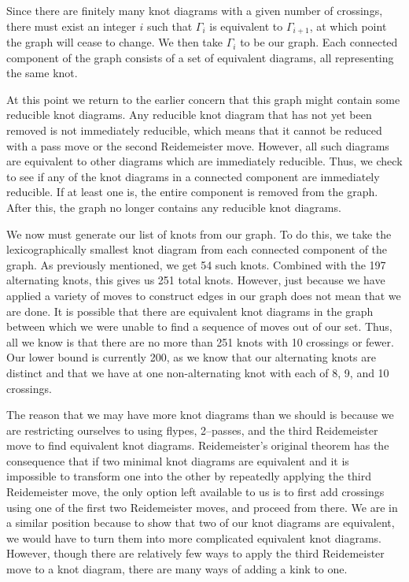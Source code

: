 \begin{paper}
Since there are finitely many knot diagrams with a given number of crossings,
there must exist an integer $i$ such that $\Gamma_i$ is equivalent to
$\Gamma_{i+1}$, at which point the graph will cease to change.
We then take $\Gamma_i$ to be our graph.
Each connected component of the graph consists of a set of equivalent diagrams,
all representing the same knot.

At this point we return to the earlier concern that this graph might contain
some reducible knot diagrams.
Any reducible knot diagram that has not yet been removed is not immediately
reducible, which means that it cannot be reduced with a pass move or the second
Reidemeister move.
However, all such diagrams are equivalent to other diagrams which are
immediately reducible.
Thus, we check to see if any of the knot diagrams in a connected component are
immediately reducible.
If at least one is, the entire component is removed from the graph.
After this, the graph no longer contains any reducible knot diagrams.

We now must generate our list of knots from our graph.
To do this, we take the lexicographically smallest knot diagram from each
connected component of the graph.
As previously mentioned, we get 54 such knots.
Combined with the 197 alternating knots, this gives us 251 total knots.
However, just because we have applied a variety of moves to construct edges in
our graph does not mean that we are done.
It is possible that there are equivalent knot diagrams in the graph between
which we were unable to find a sequence of moves out of our set.
Thus, all we know is that there are no more than 251 knots with 10 crossings or
fewer.
Our lower bound is currently 200, as we know that our alternating knots are
distinct and that we have at one non-alternating knot with each of 8, 9, and 10
crossings.

The reason that we may have more knot diagrams than we should is because we are
restricting ourselves to using flypes, 2--passes, and the third Reidemeister
move to find equivalent knot diagrams.
Reidemeister's original theorem has the consequence that if two minimal knot
diagrams are equivalent and it is impossible to transform one into the other by
repeatedly applying the third Reidemeister move, the only option left available
to us is to first add crossings using one of the first two Reidemeister moves,
and proceed from there.
We are in a similar position because to show that two of our knot diagrams are
equivalent, we would have to turn them into more complicated equivalent knot
diagrams.
However, though there are relatively few ways to apply the third Reidemeister
move to a knot diagram, there are many ways of adding a kink to one.


\end{paper}
